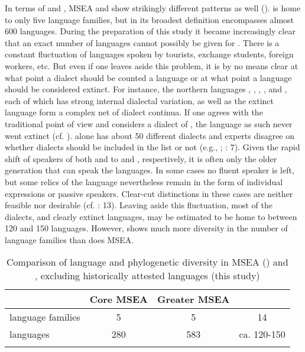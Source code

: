 In terms of  and , MSEA and  show strikingly different patterns as well ().  is home to only five language families, but in its broadest definition encompasses almost 600 languages. During the preparation of this study it became increasingly clear that an exact number of languages cannot possibly be given for . There is a constant fluctuation of languages spoken by tourists, exchange students, foreign workers, etc. But even if one leaves aside this problem, it is by no means clear at what point a dialect should be counted a language or at what point a language should be considered extinct. For instance, the northern  languages , , , , and , each of which has strong internal dialectal variation, as well as the extinct language  form a complex net of dialect continua. If one agrees with the traditional point of view and considers  a dialect of , the language as such never went extinct (cf. \citealt{DoerferKnüppel2013}).  alone has about 50 different dialects and experts disagree on whether  dialects should be included in the list or not (e.g., \citealt{WhaleyLi2000}; \citealt{Janhunen2012b}: 7). Given the rapid shift of speakers of both  and  to  and , respectively, it is often only the older generation that can speak the languages. In some cases no fluent speaker is left, but some relics of the language nevertheless remain in the form of individual expressions or passive speakers. Clear-cut distinctions in these cases are neither feasible nor desirable (cf. \citealt{Langacker2008}: 13). Leaving aside this fluctuation, most of the dialects, and clearly extinct languages,  may be estimated to be home to between 120 and 150 languages. However,  shows much more diversity in the number of language families than does MSEA.

\begin{table}
\caption{Comparison of language and phylogenetic diversity in MSEA (\citealt[6]{EnfieldComrie2015}) and , excluding historically attested languages (this study)}
\label{tab:3:2}

\begin{tabularx}{\textwidth}{QSSS}
\lsptoprule
& \textbf{Core MSEA} & \textbf{Greater MSEA} & \textbf{}\\
\midrule
language families & 5 & 5 & 14\\
languages & 280 & 583 & ca. 120-150\\
\lspbottomrule
\end{tabularx}
\end{table}

